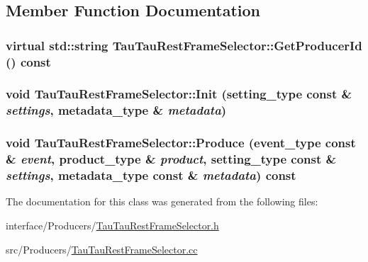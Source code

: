 \subsection{Member Function Documentation}
\hypertarget{classTauTauRestFrameSelector_a045f49f73f38509dfba1652056a49955}{
\subsubsection[{GetProducerId}]{\setlength{\rightskip}{0pt plus 5cm}virtual std::string TauTauRestFrameSelector::GetProducerId () const}}
\label{classTauTauRestFrameSelector_a045f49f73f38509dfba1652056a49955}
\hypertarget{classTauTauRestFrameSelector_afb59f86a2071c144277a0209a79f5f4d}{
\subsubsection[{Init}]{\setlength{\rightskip}{0pt plus 5cm}void TauTauRestFrameSelector::Init (setting\_\-type const \& {\em settings}, \/  metadata\_\-type \& {\em metadata})}}
\label{classTauTauRestFrameSelector_afb59f86a2071c144277a0209a79f5f4d}
\hypertarget{classTauTauRestFrameSelector_a825068b05a9345eaffc8c34895142720}{
\subsubsection[{Produce}]{\setlength{\rightskip}{0pt plus 5cm}void TauTauRestFrameSelector::Produce (event\_\-type const \& {\em event}, \/  product\_\-type \& {\em product}, \/  setting\_\-type const \& {\em settings}, \/  metadata\_\-type const \& {\em metadata}) const}}
\label{classTauTauRestFrameSelector_a825068b05a9345eaffc8c34895142720}


The documentation for this class was generated from the following files:\begin{DoxyCompactItemize}
\item 
interface/Producers/\hyperlink{TauTauRestFrameSelector_8h}{TauTauRestFrameSelector.h}\item 
src/Producers/\hyperlink{TauTauRestFrameSelector_8cc}{TauTauRestFrameSelector.cc}\end{DoxyCompactItemize}
